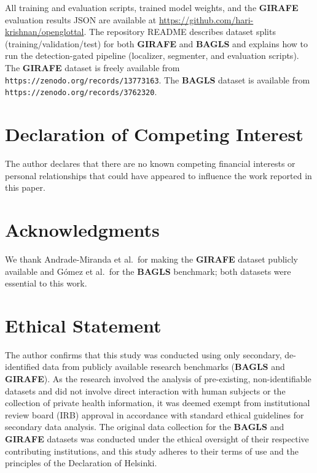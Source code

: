 \documentclass[preprint,12pt]{elsarticle}
\newcommand{\girafe}{\textbf{GIRAFE}}
\newcommand{\bagls}{\textbf{BAGLS}}
\begin{document}
All training and evaluation scripts, trained model weights, and the
\girafe{} evaluation results JSON are available at
\url{https://github.com/hari-krishnan/openglottal}.
The repository README describes dataset splits (training/validation/test) for
both \girafe{} and \bagls{} and explains how to run the detection-gated
pipeline (localizer, segmenter, and evaluation scripts).
The \girafe{} dataset \cite{andrade2025datainbrief} is freely available from
\texttt{https://zenodo.org/records/13773163}.
The \bagls{} dataset \cite{gomez2020bagls} is available from
\texttt{https://zenodo.org/records/3762320}.

\section*{Declaration of Competing Interest}
The author declares that there are no known competing financial interests or
personal relationships that could have appeared to influence the work reported
in this paper.

\section*{Acknowledgments}
We thank Andrade-Miranda et al.\ for making the \girafe{} dataset publicly
available and G\'{o}mez et al.\ for the \bagls{} benchmark; both datasets were
essential to this work.

\section*{Ethical Statement}
The author confirms that this study was conducted using only secondary,
de-identified data from publicly available research benchmarks (\bagls{} and
\girafe{}).
As the research involved the analysis of pre-existing, non-identifiable
datasets and did not involve direct interaction with human subjects or the
collection of private health information, it was deemed exempt from
institutional review board (IRB) approval in accordance with standard ethical
guidelines for secondary data analysis.
The original data collection for the \bagls{} and \girafe{} datasets was
conducted under the ethical oversight of their respective contributing
institutions, and this study adheres to their terms of use and the principles
of the Declaration of Helsinki.



\end{document}
